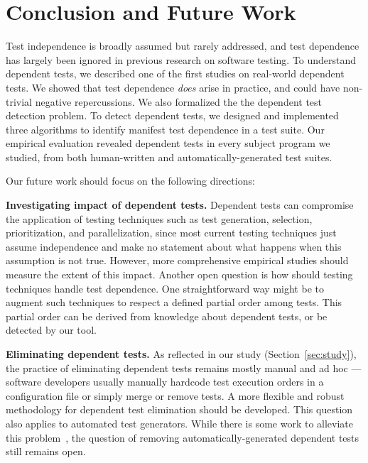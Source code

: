 \section{Conclusion and Future Work}
\label{sec:questions}

Test independence is broadly assumed but rarely addressed, and
test dependence has largely been ignored in previous
research on software testing. 
To understand dependent tests, we described one of the first studies on
real-world dependent tests. We showed that 
test dependence \textit{does} arise in practice, and could have
non-trivial negative repercussions. We also
formalized the the dependent test detection
problem. To detect dependent tests, we designed
and implemented three algorithms to identify manifest test dependence
in a test suite. Our empirical evaluation revealed
dependent tests in every subject program
we studied, from both human-written and automatically-generated test
suites.

Our future work should focus on the following directions:

\vspace{1mm}

\noindent \textbf{{Investigating impact of dependent tests.}}
Dependent tests can compromise the application of
testing techniques such as test generation, selection,
prioritization, and parallelization, since
most current testing techniques just assume independence and
make no statement about what happens when this
assumption is not true. However,
more comprehensive empirical studies should measure  
the extent of this impact.
%
Another open question is how should
testing techniques handle test dependence.
One straightforward way 
might be to augment such techniques to respect a
defined partial order among tests. This partial order
can be derived from knowledge about dependent tests,
or be detected by our \ourtool tool.



\vspace{1mm}

\noindent \textbf{{Eliminating dependent tests.}}
As reflected in our study (Section~\ref{sec:study}),
the practice of eliminating dependent tests
remains mostly manual and ad hoc --- software developers
usually manually hardcode test
execution orders in a configuration file or
simply merge or remove tests.
A more flexible and robust methodology for
dependent test elimination should be developed.
This question also applies to automated test generators.
While there is some work to alleviate
this problem~\cite{fraseretal:ISSTA:2011}, the question
of removing automatically-generated dependent tests
still remains open.

